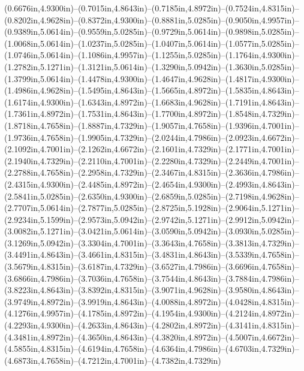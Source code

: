 (0.6676in,4.9300in)--(0.7015in,4.8643in)--(0.7185in,4.8972in)--(0.7524in,4.8315in)--(0.8202in,4.9628in)--(0.8372in,4.9300in)--(0.8881in,5.0285in)--(0.9050in,4.9957in)--(0.9389in,5.0614in)--(0.9559in,5.0285in)--(0.9729in,5.0614in)--(0.9898in,5.0285in)--(1.0068in,5.0614in)--(1.0237in,5.0285in)--(1.0407in,5.0614in)--(1.0577in,5.0285in)--(1.0746in,5.0614in)--(1.1086in,4.9957in)--(1.1255in,5.0285in)--(1.1764in,4.9300in)--(1.2782in,5.1271in)--(1.3121in,5.0614in)--(1.3290in,5.0942in)--(1.3630in,5.0285in)--(1.3799in,5.0614in)--(1.4478in,4.9300in)--(1.4647in,4.9628in)--(1.4817in,4.9300in)--(1.4986in,4.9628in)--(1.5495in,4.8643in)--(1.5665in,4.8972in)--(1.5835in,4.8643in)--(1.6174in,4.9300in)--(1.6343in,4.8972in)--(1.6683in,4.9628in)--(1.7191in,4.8643in)--(1.7361in,4.8972in)--(1.7531in,4.8643in)--(1.7700in,4.8972in)--(1.8548in,4.7329in)--(1.8718in,4.7658in)--(1.8887in,4.7329in)--(1.9057in,4.7658in)--(1.9396in,4.7001in)--(1.9736in,4.7658in)--(1.9905in,4.7329in)--(2.0244in,4.7986in)--(2.0923in,4.6672in)--(2.1092in,4.7001in)--(2.1262in,4.6672in)--(2.1601in,4.7329in)--(2.1771in,4.7001in)--(2.1940in,4.7329in)--(2.2110in,4.7001in)--(2.2280in,4.7329in)--(2.2449in,4.7001in)--(2.2788in,4.7658in)--(2.2958in,4.7329in)--(2.3467in,4.8315in)--(2.3636in,4.7986in)--(2.4315in,4.9300in)--(2.4485in,4.8972in)--(2.4654in,4.9300in)--(2.4993in,4.8643in)--(2.5841in,5.0285in)--(2.6350in,4.9300in)--(2.6859in,5.0285in)--(2.7198in,4.9628in)--(2.7707in,5.0614in)--(2.7877in,5.0285in)--(2.8725in,5.1928in)--(2.9064in,5.1271in)--(2.9234in,5.1599in)--(2.9573in,5.0942in)--(2.9742in,5.1271in)--(2.9912in,5.0942in)--(3.0082in,5.1271in)--(3.0421in,5.0614in)--(3.0590in,5.0942in)--(3.0930in,5.0285in)--(3.1269in,5.0942in)--(3.3304in,4.7001in)--(3.3643in,4.7658in)--(3.3813in,4.7329in)--(3.4491in,4.8643in)--(3.4661in,4.8315in)--(3.4831in,4.8643in)--(3.5339in,4.7658in)--(3.5679in,4.8315in)--(3.6187in,4.7329in)--(3.6527in,4.7986in)--(3.6696in,4.7658in)--(3.6866in,4.7986in)--(3.7036in,4.7658in)--(3.7544in,4.8643in)--(3.7884in,4.7986in)--(3.8223in,4.8643in)--(3.8392in,4.8315in)--(3.9071in,4.9628in)--(3.9580in,4.8643in)--(3.9749in,4.8972in)--(3.9919in,4.8643in)--(4.0088in,4.8972in)--(4.0428in,4.8315in)--(4.1276in,4.9957in)--(4.1785in,4.8972in)--(4.1954in,4.9300in)--(4.2124in,4.8972in)--(4.2293in,4.9300in)--(4.2633in,4.8643in)--(4.2802in,4.8972in)--(4.3141in,4.8315in)--(4.3481in,4.8972in)--(4.3650in,4.8643in)--(4.3820in,4.8972in)--(4.5007in,4.6672in)--(4.5855in,4.8315in)--(4.6194in,4.7658in)--(4.6364in,4.7986in)--(4.6703in,4.7329in)--(4.6873in,4.7658in)--(4.7212in,4.7001in)--(4.7382in,4.7329in)
